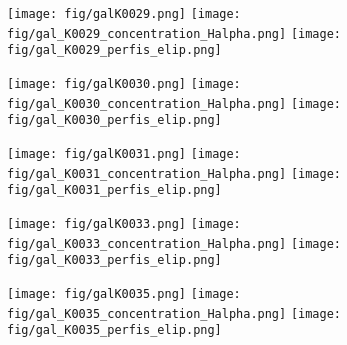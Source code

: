 \begin{figure}[!ht]
\begin{center}
\setcaptionmargin{1cm}
\texttt{[image: fig/galK0029.png]}
\texttt{[image: fig/gal\_K0029\_concentration\_Halpha.png]}
\texttt{[image: fig/gal\_K0029\_perfis\_elip.png]}
\end{center}
\end{figure}


\begin{figure}[!ht]
\begin{center}
\setcaptionmargin{1cm}
\texttt{[image: fig/galK0030.png]}
\texttt{[image: fig/gal\_K0030\_concentration\_Halpha.png]}
\texttt{[image: fig/gal\_K0030\_perfis\_elip.png]}
\end{center}
\end{figure}


\begin{figure}[!ht]
\begin{center}
\setcaptionmargin{1cm}
\texttt{[image: fig/galK0031.png]}
\texttt{[image: fig/gal\_K0031\_concentration\_Halpha.png]}
\texttt{[image: fig/gal\_K0031\_perfis\_elip.png]}
\end{center}
\end{figure}


\begin{figure}[!ht]
\begin{center}
\setcaptionmargin{1cm}
\texttt{[image: fig/galK0033.png]}
\texttt{[image: fig/gal\_K0033\_concentration\_Halpha.png]}
\texttt{[image: fig/gal\_K0033\_perfis\_elip.png]}
\end{center}
\end{figure}


\begin{figure}[!ht]
\begin{center}
\setcaptionmargin{1cm}
\texttt{[image: fig/galK0035.png]}
\texttt{[image: fig/gal\_K0035\_concentration\_Halpha.png]}
\texttt{[image: fig/gal\_K0035\_perfis\_elip.png]}
\end{center}
\end{figure}


